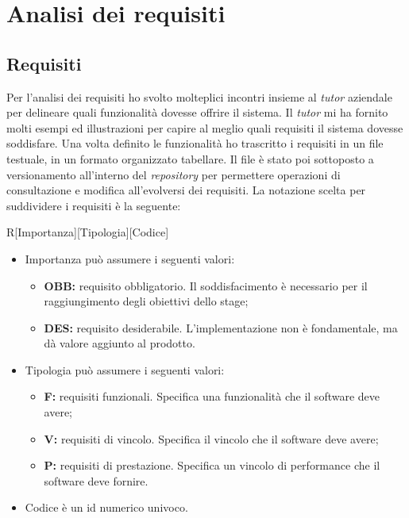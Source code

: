 \section{Analisi dei requisiti} 
\subsection{Requisiti}
Per l'analisi dei requisiti ho svolto molteplici incontri insieme al \emph{tutor} aziendale per delineare quali funzionalità dovesse offrire il sistema. Il \emph{tutor} mi ha fornito molti esempi ed illustrazioni per capire al meglio quali requisiti il sistema dovesse soddisfare. Una volta definito le funzionalità ho trascritto i requisiti in un file testuale, in un formato organizzato tabellare. Il file è stato poi sottoposto a versionamento all'interno del \emph{repository} per permettere operazioni di consultazione e modifica all'evolversi dei requisiti. La notazione scelta per suddividere i requisiti è la seguente: 
\begin{center}
R[Importanza][Tipologia][Codice]
\end{center}
\begin{itemize}
\item Importanza può assumere i seguenti valori:
\begin{itemize}
\item \textbf{OBB:} requisito obbligatorio. Il soddisfacimento è necessario per il raggiungimento degli obiettivi dello stage;
\item \textbf{DES:} requisito desiderabile. L'implementazione non è fondamentale, ma
dà valore aggiunto al prodotto.
\end{itemize}
\item Tipologia può assumere i seguenti valori:
\begin{itemize}
\item \textbf{F:} requisiti funzionali. Specifica una funzionalità che il software deve avere;
\item \textbf{V:} requisiti di vincolo. Specifica il vincolo che il software deve avere;
\item \textbf{P:} requisiti di prestazione. Specifica un vincolo di performance che il software deve fornire.
\end{itemize}
\item Codice è un id numerico univoco.
\end{itemize}

